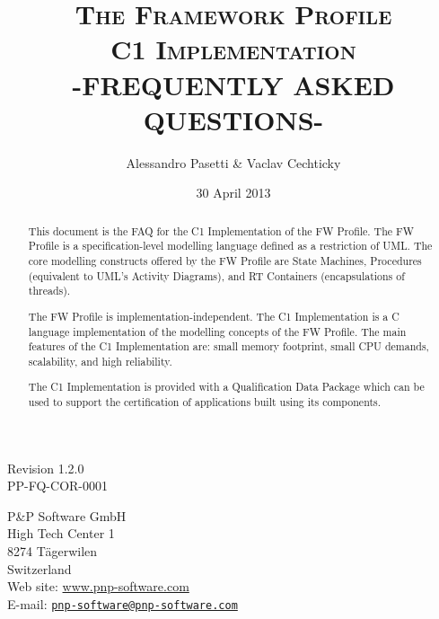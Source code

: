 \documentclass[a4paper,10pt]{article}
\title{\textsc{The Framework Profile} \\ \textsc{C1 Implementation} \\ \textsc{-FREQUENTLY ASKED QUESTIONS-}}
\author{Alessandro Pasetti \& Vaclav Cechticky}
\date{30 April 2013}
\begin{document}
\maketitle

\begin{center}
Revision 1.2.0 \\
PP-FQ-COR-0001
\end{center}

\vspace{1cm}

\begin{center}
P\&P Software GmbH \\
High Tech Center 1 \\
8274 T\"{a}gerwilen \\
Switzerland \\
\vspace{2mm}
Web site: \url{www.pnp-software.com}\\
E-mail: \href{mailto:pnp-software@pnp-software.com}{\nolinkurl{pnp-software@pnp-software.com}} 
\end{center}

\vspace{0.5cm}

\begin{table}[ht]
\begin{center}
\begin{tabular}{p{11.7cm}}
\\
\hline
\end{tabular}
\end{center}
\end{table}
\begin{abstract}
This document is the FAQ for the C1 Implementation of the FW Profile. The FW Profile is a specification-level modelling language defined as a restriction of UML. The core modelling constructs offered by the FW Profile are State Machines, Procedures (equivalent to UML's Activity Diagrams), and RT Containers (encapsulations of threads).
\par
The FW Profile is implementation-independent. The C1 Implementation is a C language implementation of the modelling concepts of the FW Profile. The main features of the C1 Implementation are: small memory footprint, small CPU demands, scalability, and
high reliability. 
\par
The C1 Implementation is provided with a Qualification Data Package which can be used to support the certification of applications built using its components.
\end{abstract}
\begin{table}[ht]
\begin{center}
\begin{tabular}{p{11.7cm}}
\\
\hline
\end{tabular}
\end{center}
\end{table}
\end{document}
